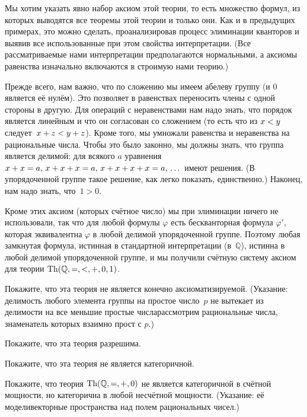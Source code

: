 Мы хотим указать явно набор аксиом этой теории, то есть
множество формул, из которых выводятся все теоремы этой теории и
только они. Как и в предыдущих примерах, это можно сделать,
проанализировав процесс элиминации кванторов и выявив все
использованные при этом свойства интерпретации. (Все
рассматриваемые нами интерпретации предполагаются нормальными, а
аксиомы равенства изначально включаются в строимую нами теорию.)

Прежде всего, нам важно, что по сложению мы имеем абелеву группу
(и $0$ является её нулём). Это позволяет в равенствах переносить
члены с одной стороны в другую. Для операций с неравенствами нам
надо знать, что порядок является линейным и что он согласован со
сложением (то есть что из $x\hm<y$ следует~${x+z}\hm<{y+z}$).
Кроме того, мы умножали равенства и неравенства на рациональные
числа. Чтобы это было законно, мы должны знать, что группа
является делимой: для всякого $a$ уравнения ${x+x}\hm=a,\,
{x+x+x}\hm=a,\,{x+x+x+x}\hm=a,\,\dots$ имеют решения. (В
упорядоченной группе такое решение, как легко показать,
единственно.) Наконец, нам надо знать, что~$1>0$.

Кроме этих аксиом (которых счётное число) мы при элиминации
ничего не использовали, так что для любой формулы $\varphi$ есть
бескванторная формула $\varphi'$, которая эквивалентна $\varphi$
в любой делимой упорядоченной группе. Поэтому любая замкнутая
формула, истинная в стандартной интерпретации (в~$\mathbb{Q}$),
истинна в любой делимой упорядоченной группе, и мы получили
счётную систему аксиом для теории
$\operatorname{Th}(\mathbb{Q},{=},{<},{+},0,1)$.

\begin{problem}
Покажите, что эта теория не является конечно аксиоматизируемой.
(Указание: делимость любого элемента группы
на простое число~$p$ не вытекает из делимости
на все меньшие простые числа\т рассмотрим рациональные числа,
знаменатель которых взаимно прост с $p$.)
\end{problem}

\begin{problem}
Покажите, что эта теория разрешима.
\end{problem}

\begin{problem}
Покажите, что эта теория не является категоричной.
\end{problem}

\begin{problem}
Покажите, что теория $\operatorname{Th}(\mathbb{Q},{=},{+},0)$ не является
категоричной в счётной мощности, но категорична в любой несчётной
мощности. (Указание: её модели\т векторные пространства над
полем рациональных чисел.)
\end{problem}

